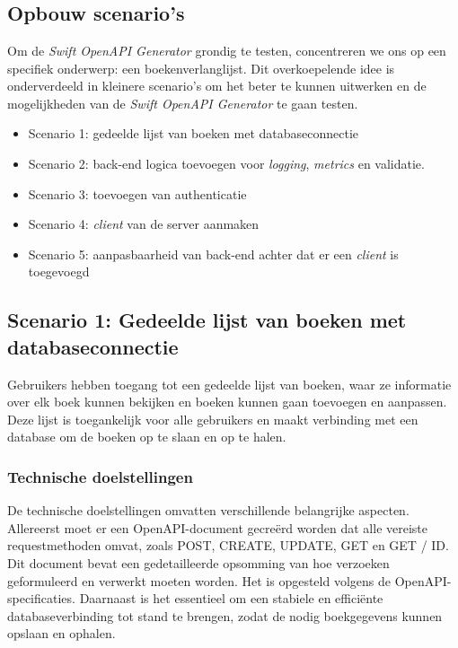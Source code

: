 
\chapter{}%

\label{ch:proof-of-concept}

\section{Opbouw scenario's}

Om de \textit{Swift OpenAPI Generator} grondig te testen, concentreren we ons op een specifiek onderwerp: een boekenverlanglijst. Dit overkoepelende idee is onderverdeeld in kleinere scenario’s om het beter te kunnen uitwerken en de mogelijkheden van de \textit{Swift OpenAPI Generator} te gaan testen. 

\begin{itemize}
  \item	Scenario 1: gedeelde lijst van boeken met databaseconnectie
  \item	Scenario 2: back-end logica toevoegen voor \textit{logging}, \textit{metrics} en validatie. 
  \item Scenario 3: toevoegen van authenticatie
  \item Scenario 4: \textit{client} van de server aanmaken
  \item Scenario 5: aanpasbaarheid van back-end achter dat er een \textit{client} is toegevoegd
\end{itemize}

\section{Scenario 1: Gedeelde lijst van boeken met databaseconnectie}
Gebruikers hebben toegang tot een gedeelde lijst van boeken, waar ze informatie over elk boek kunnen bekijken en boeken kunnen gaan toevoegen en aanpassen. Deze lijst is toegankelijk voor alle gebruikers en maakt verbinding met een database om de boeken op te slaan en op te halen. 

\subsection{Technische doelstellingen}
De technische doelstellingen omvatten verschillende belangrijke aspecten. Allereerst moet er een OpenAPI-document gecreërd worden dat alle vereiste requestmethoden omvat, zoals POST, CREATE, UPDATE, GET en GET / ID.  Dit document bevat een gedetailleerde opsomming van hoe verzoeken geformuleerd en verwerkt moeten worden. Het is opgesteld volgens de OpenAPI-specificaties. Daarnaast is het essentieel om een stabiele en efficiënte databaseverbinding tot stand te brengen, zodat de nodig boekgegevens kunnen opslaan en ophalen. 

